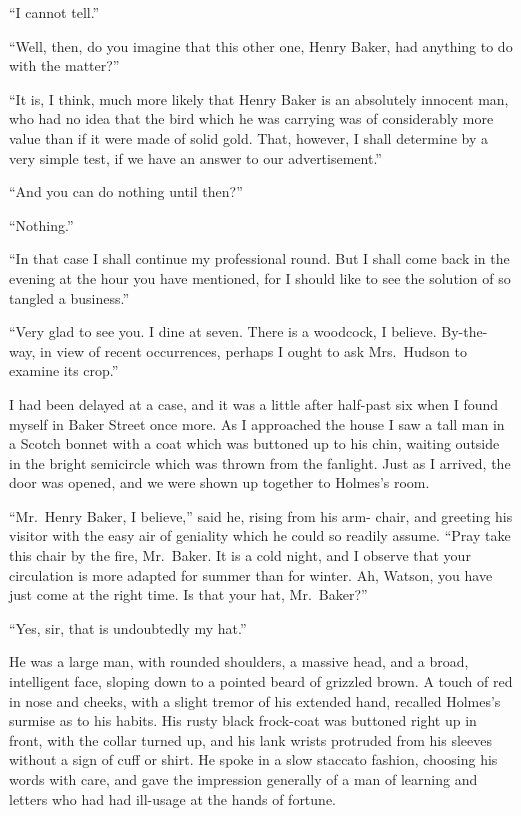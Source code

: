 “I cannot tell.”

“Well, then, do you imagine that this other one, Henry
Baker, had anything to do with the matter?”

“It is, I think, much more likely that Henry Baker is an
absolutely innocent man, who had no idea that the bird which
he was carrying was of considerably more value than if it
were made of solid gold. That, however, I shall determine
by a very simple test, if we have an answer to our advertisement.”

“And you can do nothing until then?”

“Nothing.”

“In that case I shall continue my professional round. But
I shall come back in the evening at the hour you have
mentioned, for I should like to see the solution of so tangled a
business.”

“Very glad to see you. I dine at seven. There is a
woodcock, I believe. By-the-way, in view of recent occurrences,
perhaps I ought to ask Mrs.~Hudson to examine its crop.”

I had been delayed at a case, and it was a little after half-past
six when I found myself in Baker Street once more. As
I approached the house I saw a tall man in a Scotch bonnet
with a coat which was buttoned up to his chin, waiting outside
in the bright semicircle which was thrown from the fanlight.
Just as I arrived, the door was opened, and we were
shown up together to Holmes’s room.

“Mr.~Henry Baker, I believe,” said he, rising from his arm-%
chair, and greeting his visitor with the easy air of geniality
which he could so readily assume. “Pray take this chair by
the fire, Mr.~Baker. It is a cold night, and I observe that
your circulation is more adapted for summer than for winter.
Ah, Watson, you have just come at the right time. Is that
your hat, Mr.~Baker?”

“Yes, sir, that is undoubtedly my hat.”

He was a large man, with rounded shoulders, a massive
head, and a broad, intelligent face, sloping down to a pointed
beard of grizzled brown. A touch of red in nose and cheeks,
with a slight tremor of his extended hand, recalled Holmes’s
surmise as to his habits. His rusty black frock-coat was buttoned
right up in front, with the collar turned up, and his lank
wrists protruded from his sleeves without a sign of cuff or
shirt. He spoke in a slow staccato fashion, choosing his
words with care, and gave the impression generally of a man
of learning and letters who had had ill-usage at the hands of
fortune.


